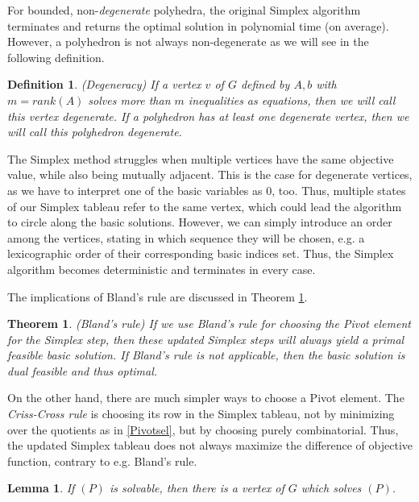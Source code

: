 \documentclass[a4paper, 11pt]{article}
\newtheorem{mydef}{Definition}
\newtheorem{lemma}{Lemma}
\newtheorem{theorem}{Theorem}
\begin{document}
For bounded, non-\textit{degenerate} polyhedra, the original Simplex algorithm terminates and returns the optimal solution in polynomial time (on average). However, a polyhedron is not always non-degenerate as we will see in the following definition.

\begin{mydef}(Degeneracy)\medskip
	If a vertex $v$ of $G$ defined by $A,b$ with $m=rank(A)$ solves more than $m$ inequalities as equations, then we will call this vertex \emph{degenerate}. \medskip
	If a polyhedron has at least one degenerate vertex, then we will call this polyhedron \emph{degenerate}.
\end{mydef}

The Simplex method struggles when multiple vertices have the same objective value, while also being mutually adjacent. This is the case for degenerate vertices, as we have to interpret one of the basic variables as $0$, too. Thus, multiple states of our Simplex tableau refer to the same vertex, which could lead the algorithm to circle along the basic solutions. However, we can simply introduce an order among the vertices, stating in which sequence they will be chosen, e.g. a lexicographic order of their corresponding basic indices set. Thus, the Simplex algorithm becomes deterministic and terminates in every case.\medskip

The implications of Bland's rule are discussed in Theorem \ref{Bland}.

\begin{theorem}(Bland's rule)\medskip
	\label{Bland}
	If we use Bland's rule for choosing the Pivot element for the Simplex step, then these updated Simplex steps will always yield a primal feasible basic solution. If Bland's rule is not applicable, then the basic solution is dual feasible and thus optimal.
\end{theorem}

On the other hand, there are much simpler ways to choose a Pivot element. The \textit{Criss-Cross rule} is choosing its row in the Simplex tableau, not by minimizing over the quotients as in \ref{Pivotsel}, but by choosing purely combinatorial. Thus, the updated Simplex tableau does not always maximize the difference of objective function, contrary to e.g. Bland's rule. 

\begin{lemma}
	\label{theo4}
	If $(P)$ is solvable, then there is a vertex of $G$ which solves $(P)$.
\end{lemma}
\end{document}
